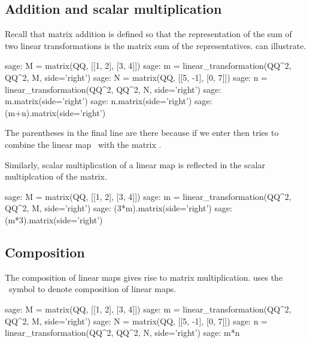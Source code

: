 \subsection{Addition and scalar multiplication}
Recall that matrix addition is defined so that the representation of
the sum of two linear transformations is the matrix sum of the representatives.
\Sage{} can illustrate.
\begin{sagecommandline}
sage: M = matrix(QQ, [[1, 2], [3, 4]])
sage: m = linear_transformation(QQ^2, QQ^2, M, side='right')
sage: N = matrix(QQ, [[5, -1], [0, 7]])
sage: n = linear_transformation(QQ^2, QQ^2, N, side='right')
sage: m.matrix(side='right')
sage: n.matrix(side='right')
sage: (m+n).matrix(side='right')
\end{sagecommandline}
The parentheses in the final line are there because
if we enter  then \Sage{} tries to combine
the linear map~ 
with the matrix .

Similarly, scalar multiplication of a linear map is reflected in 
the scalar multiplcation of the matrix.
\begin{sagecommandline}
sage: M = matrix(QQ, [[1, 2], [3, 4]])
sage: m = linear_transformation(QQ^2, QQ^2, M, side='right')
sage: (3*m).matrix(side='right')
sage: (m*3).matrix(side='right')
\end{sagecommandline}



\subsection{Composition}
The composition of linear maps gives rise to matrix multiplication.
\Sage{} uses the \inlinecode{*}~symbol to denote composition of linear maps.
\begin{sagecommandline}
sage: M = matrix(QQ, [[1, 2], [3, 4]])
sage: m = linear_transformation(QQ^2, QQ^2, M, side='right')
sage: N = matrix(QQ, [[5, -1], [0, 7]])
sage: n = linear_transformation(QQ^2, QQ^2, N, side='right')
sage: m*n
\end{sagecommandline}

